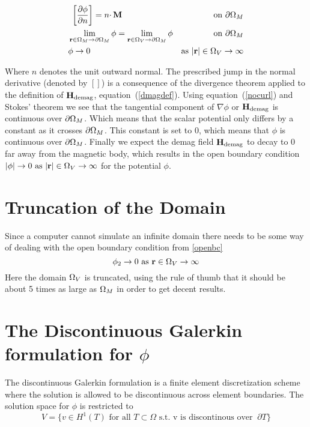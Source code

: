 \documentclass[12pt,a4paper,notitlepage]{article}
\begin{document}
\begin{subequations}
\begin{align}
&\ \left[ \frac{\partial \phi}{\partial n} \right] = n \cdotp \mathbf{M}  &\mbox{ on }  \partial \Omega_M \label{jumpbc} \\
&\lim_{\mathbf{r} \in \Omega_M \rightarrow \partial \Omega_M} \phi =  \lim_{\mathbf{r} \in \Omega_V \rightarrow \partial \Omega_M} 
\phi & \mbox{on } \partial \Omega_M \label{contbc} \\
&\phi \rightarrow 0 \ & \mbox{as} \ |\mathbf{r}| \in \Omega_V \rightarrow \infty \label{openbc}
\end{align}
\end{subequations}

\noindent Where $n$ denotes the unit outward normal. The prescribed jump in the normal derivative (denoted by $[ ]$) is a 
consequence of the divergence theorem applied to the definition of $\mathbf{H}_\mathrm{demag}$, equation~(\ref{dmagdef}).
Using equation~(\ref{nocurl}) and Stokes' theorem we see that the tangential component of $\nabla \phi$ or $\mathbf{H}_\mathrm{demag}$ is
continuous over $\partial \Omega_M$. Which means that the scalar potential only differs by a constant as it crosses $\partial \Omega_M$.
This constant is set to 0, which means that $\phi$ is continuous over $\partial \Omega_M$. Finally we expect the demag field $\mathbf{H}_\mathrm{demag}$ 
to decay to 0 far away from the magnetic body, which results in the open boundary condition
$| \phi | \rightarrow 0  \ \mbox{as} \ |\mathbf{r}| \in \Omega_V \rightarrow \infty$ for the potential $\phi$. 


\section{Truncation of the Domain}
Since a computer cannot simulate an infinite domain there needs to be some way of dealing with the open boundary condition from
\ref{openbc}
\[\phi_2 \rightarrow 0 \ \mbox{as} \ \mathbf{r} \in \Omega_V \rightarrow \infty \]
Here the domain $\Omega_V$ is truncated, using the rule of thumb that it should be about 5 times as large as $\Omega_M$ in order to get
decent results. 

\section{The Discontinuous Galerkin formulation for $\phi$}\label{dgsection}
The discontinuous Galerkin formulation is a finite element discretization scheme where the 
solution is allowed to be discontinuous across element boundaries. The solution space for 
$\phi$ is restricted to 
\begin{equation}\label{dgdef} 
 V = \{ v \in H^1 (T) \mbox{ for all } T \subset \Omega \mbox{ s.t. v is discontinous over } \ \partial T \}
\end{equation}
\end{document}
